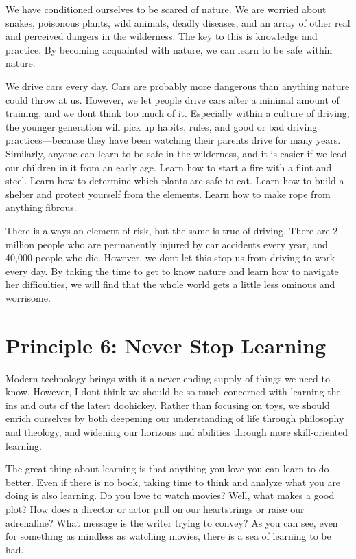 We have conditioned ourselves to be scared of nature. We are worried
about snakes, poisonous plants, wild animals, deadly diseases, and an
array of other real and perceived dangers in the wilderness. The key to
this is knowledge and practice. By becoming acquainted with nature, we
can learn to be safe within nature. 

We drive cars every day. Cars are probably more dangerous than anything
nature could throw at us. However, we let people drive cars after a
minimal amount of training, and
we
don{\textquotesingle}t think too much of it. Especially
within a culture of
driving, the younger
generation will pick up habits, rules, and good or bad driving
practices—because they have been watching their parents drive for many
years. Similarly, anyone can learn to be safe in the wilderness, and
it is easier if we lead our children in it from an early age. Learn how
to start a fire with a flint and steel. Learn how to determine which
plants are safe to eat. Learn how to build a shelter and protect
yourself from the elements. Learn how to make rope from anything
fibrous. 

There is always an element of risk, but the same is true of driving.
There are 2 million people who are permanently injured by car accidents
every year, and 40,000 people who die. However, we
don{\textquotesingle}t let this stop us from driving to work every day.
By taking the time to get to know nature and learn how to navigate her
difficulties, we will find that the whole world gets a little less
ominous and worrisome. 

\section{Principle 6: Never Stop Learning}

Modern technology brings with it a never-ending supply of things we need
to know. However, I don{\textquotesingle}t think we should be so much
concerned with learning the ins and outs of the latest doohickey.
Rather than focusing on toys, we should enrich ourselves by both
deepening our understanding of life through philosophy and theology,
and widening our horizons and abilities through more skill-oriented
learning.

The great thing about learning is that anything you love you can learn
to do better. Even if there is no book, taking time to think and
analyze what you are doing is also learning. Do you love to watch
movies? Well, what makes a good plot?  How does a director or actor
pull on our heartstrings or raise our adrenaline?  What message is the
writer trying to convey?  As you can see, even for something as
mindless as watching movies, there is a sea of learning to be had.

